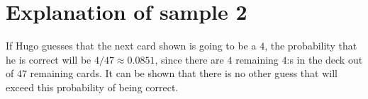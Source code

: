 \section*{Explanation of sample 2}
If Hugo guesses that the next card shown is going to be a $4$, the probability that
he is correct will be $4/47 \approx 0.0851$, since there are $4$ remaining $4$:s in the deck out of $47$ remaining cards.
It can be shown that there is no other guess that will exceed this probability of being correct.
